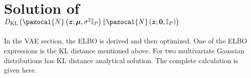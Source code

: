 
\section{Solution of $\KL{\pazocal{N}\left(\boldsymbol{z}; \boldsymbol{\mu},\sigma^2\mathbb{I}_P  \right) }{\pazocal{N}\left(\boldsymbol{z}; \boldsymbol{0},\mathbb{I}_P  \right)}$}
In the VAE section, the ELBO is derived and then optimized. One of the ELBO expressions is the KL distance mentioned above. For two multivariate Gaussian distributions has KL distance analytical solution. The complete calculation is given here. 